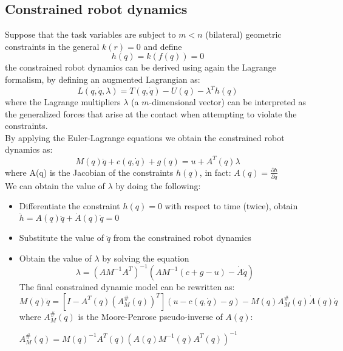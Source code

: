\documentclass[a4paper,12pt]{article}
\begin{document}
\subsection{Constrained robot dynamics}
Suppose that the task variables are subject to $m < n$ (bilateral)
geometric constraints in the general $k(r)=0$ and define \begin{equation}
h(q)=k(f(q))=0
\end{equation}
the constrained robot dynamics can be derived using again the
Lagrange formalism, by defining an augmented Lagrangian as:
\begin{equation}
    L(q,\dot{q},\lambda)=T(q,\dot{q})-U(q)-\lambda^T h(q)
\end{equation}
where the Lagrange multipliers $\lambda$ (a $m$-dimensional vector) can
be interpreted as the generalized forces that arise at the contact
when attempting to violate the constraints.\\
By applying the Euler-Lagrange equations we obtain 
the constrained robot dynamics as:
\begin{equation}
    M(q)\ddot{q} + c(q,\dot{q}) + g(q) = u +A^T(q)\lambda
\end{equation}
where A(q) is the Jacobian of the constraints $h(q)$, in fact: $A(q)=\frac{\partial h}{\partial q}$\\
We can obtain the value of $\lambda$ by doing the following:
\begin{itemize}
\item Differentiate the constraint $h(q)=0$ with respect to time (twice),
obtain $\ddot{h}=A(q)\ddot{q}+\dot{A}(q)\dot{q}=0$
\item Substitute the value of $\ddot{q}$ from the constrained robot dynamics
\item Obtain the value of $\lambda$ by solving the equation 
\begin{equation}
    \lambda = (AM^{-1}A^T)^{-1}(AM^{-1}(c+g-u)-\dot{A}\dot{q})
\end{equation}
The final constrained dynamic model can be rewritten as:
\begin{equation}
    M(q)\ddot{q} = [I -A^T(q)(A_M^{\#}(q))^T](u-c(q,\dot{q})-g)-M(q)A_M^{\#}(q)\dot{A}(q)\dot{q}
\end{equation}
where $A_M^{\#}(q)$ is the Moore-Penrose pseudo-inverse of $A(q)$:\\
\begin{center}
    $A_M^{\#}(q)=M(q)^{-1}A^T(q)(A(q)M^{-1}(q)A^T(q))^{-1}$
\end{center}
\end{itemize}
\end{document}
